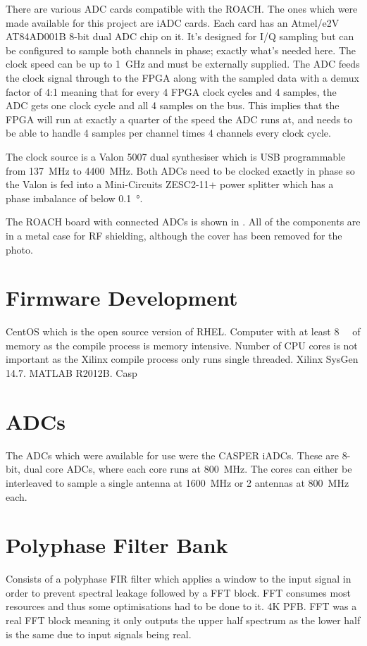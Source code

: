 There are various ADC cards compatible with the ROACH. The ones which were made available for this project are iADC cards. Each card has an Atmel/e2V AT84AD001B 8-bit dual ADC chip on it. It's designed for I/Q sampling but can be configured to sample both channels in phase; exactly what's needed here. The clock speed can be up to \SI{1}{\giga\hertz} and must be externally supplied. The ADC feeds the clock signal through to the FPGA along with the sampled data with a demux factor of 4:1 meaning that for every 4 FPGA clock cycles and 4 samples, the ADC gets one clock cycle and all 4 samples on the bus. This implies that the FPGA will run at exactly a quarter of the speed the ADC runs at, and needs to be able to handle 4 samples per channel times 4 channels every clock cycle.

The clock source is a Valon 5007 dual synthesiser which is USB programmable from \SI{137}{\mega\hertz} to \SI{4400}{\mega\hertz}. Both ADCs need to be clocked exactly in phase so the Valon is fed into a Mini-Circuits ZESC2-11+ power splitter which has a phase imbalance of below \SI{0.1}{\degree}.

The ROACH board with connected ADCs is shown in . All of the components are in a metal case for RF shielding, although the cover has been removed for the photo.


\section{Firmware Development}
CentOS which is the open source version of RHEL. Computer with at least \SI{8}{\giga\byte} of memory as the compile process is memory intensive. 
Number of CPU cores is not important as the Xilinx compile process only runs single threaded.
Xilinx SysGen 14.7.
MATLAB R2012B. 
Casp

\section{ADCs}
The ADCs which were available for use were the CASPER iADCs. 
These are 8-bit, dual core ADCs, where each core runs at \SI{800}{\mega\hertz}. The cores can either be interleaved to sample a single antenna at \SI{1600}{\mega\hertz} or 2 antennas at \SI{800}{\mega\hertz} each.

\section{Polyphase Filter Bank}
Consists of a polyphase FIR filter which applies a window to the input signal in order to prevent spectral leakage followed by a FFT block. FFT consumes most resources and thus some optimisations had to be done to it. 4K PFB. FFT was a real FFT block meaning it only outputs the upper half spectrum as the lower half is the same due to input signals being real. 

